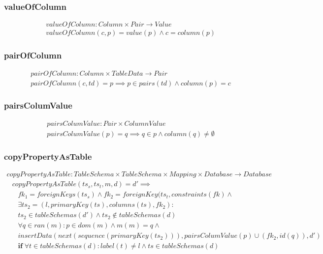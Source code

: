 \documentclass[10pt]{article}
\begin{document}
\subsubsection{valueOfColumn}
\begin{align}
& valueOfColumn: Column \times Pair \rightarrow Value \\
& valueOfColumn(c, p) = value(p) \land c = column(p)
\end{align}

\subsubsection{pairOfColumn}
\begin{align}
& pairOfColumn: Column \times TableData \rightarrow Pair \\
& pairOfColumn(c, td) = p \implies p \in pairs(td) \land column(p) = c
\end{align}


\subsubsection{pairsColumValue}
\begin{align}
& pairsColumValue: Pair \times ColumnValue \\
& pairsColumValue(p) = q \implies q \in p \land column(q) \neq \emptyset  
\end{align}

\subsubsection{copyPropertyAsTable}
\begin{align}
copyPropertyAsTable: TableSchema \times TableSchema \times Mapping \times Database \rightarrow Database
\end{align}
\begin{align}
& copyPropertyAsTable(ts_s, ts_t, m, d) = d' \implies \nonumber  \\
& \;\;\; fk_1 = foreignKeys(ts_s) \land fk_2 = foreignKey(ts_t, constraints(fk) \land \nonumber   \\
& \;\;\;  \exists ts_2 = (l, primaryKey(ts), columns(ts), fk_2) :  \nonumber \\
& \;\;\;  ts_2 \in tableSchemas(d') \land ts_2 \notin tableSchemas(d) \nonumber \\
& \;\;\; \forall q \in ran(m) : p \in dom(m) \land m(m) = q \land \nonumber \\  
& \;\;\; insertData(next(sequence(primaryKey(ts_2))), pairsColumValue(p) \cup (fk_2, id(q)) , d')  \nonumber \\
& \;\;\; \mathbf{if} \; \forall t \in tableSchemas(d) : label(t) \neq l \land ts \in tableSchemas(d)
\end{align}
\end{document}
